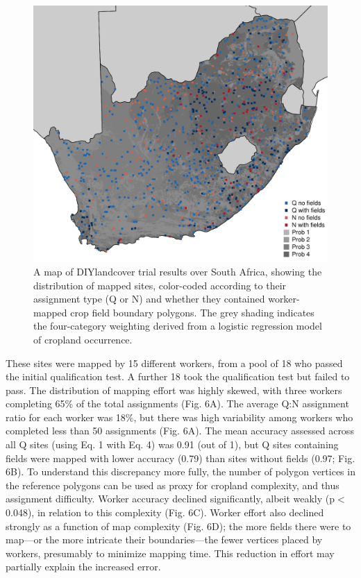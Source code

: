 \documentclass[preprint,12pt,authoryear]{elsarticle}
\begin{document}
\begin{figure}[!ht]
  \begin{center}
    \includegraphics[scale=0.7]{figures/fig5.pdf}
    \caption{A map of DIYlandcover trial results over South Africa, showing the distribution of mapped sites, color-coded according to their assignment type (Q or N) and whether they contained worker-mapped crop field boundary polygons. The grey shading indicates the four-category weighting derived from a logistic regression model of cropland occurrence.}
    \label{default}
  \end{center}
\end{figure}

These sites were mapped by 15 different workers, from a pool of 18 who passed the initial qualification test. A further 18 took the qualification test but failed to pass. The distribution of mapping effort was highly skewed, with three workers completing 65\% of the total assignments (Fig. 6A).  The average Q:N assignment ratio for each worker was 18\%, but there was high variability among workers who completed less than 50 assignments (Fig. 6A). The mean accuracy assessed across all Q sites (using Eq. 1 with Eq. 4) was 0.91 (out of 1), but Q sites containing fields were mapped with lower accuracy (0.79) than sites without fields (0.97; Fig. 6B). To understand this discrepancy more fully,  the number of polygon vertices in the reference polygons can be used as proxy for cropland complexity, and thus assignment difficulty.  Worker accuracy declined significantly, albeit weakly (p$<$0.048), in relation to this complexity (Fig. 6C). Worker effort also declined strongly as a function of map complexity (Fig. 6D); the more fields there were to map---or the more intricate their boundaries---the fewer vertices placed by workers, presumably to minimize mapping time. This reduction in effort may partially explain the increased error. 
\end{document}
